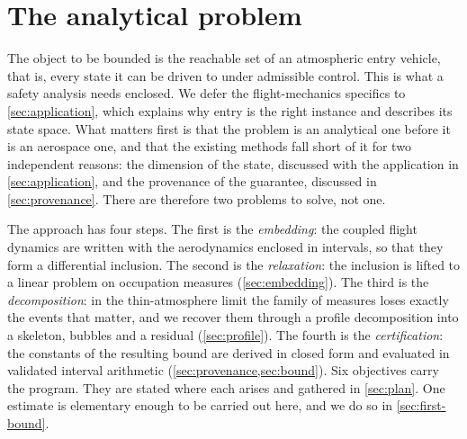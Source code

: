 \documentclass[english,11pt]{extarticle}
\begin{document}
\section{The analytical problem}
The object to be bounded is the reachable set of an atmospheric entry
vehicle, that is, every state it can be driven to under admissible control.
This is what a safety analysis needs enclosed. We defer the flight-mechanics
specifics to \cref{sec:application}, which explains why entry is the right
instance and describes its state space. What matters first is that the
problem is an analytical one before it is an aerospace one, and that the
existing methods fall short of it for two independent reasons: the
dimension of the state, discussed with the application in
\cref{sec:application}, and the provenance of the guarantee, discussed in
\cref{sec:provenance}. There are therefore two problems to solve, not one.

The approach has four steps. The first is the \emph{embedding}: the coupled
flight dynamics are written with the aerodynamics enclosed in intervals, so
that they form a differential inclusion. The second is the
\emph{relaxation}: the inclusion is lifted to a linear problem on occupation
measures (\cref{sec:embedding}). The third is the \emph{decomposition}: in
the thin-atmosphere limit the family of measures loses exactly the events
that matter, and we recover them through a profile decomposition into a
skeleton, bubbles and a residual (\cref{sec:profile}). The fourth is the
\emph{certification}: the constants of the resulting bound are derived in
closed form and evaluated in validated interval arithmetic
(\cref{sec:provenance,sec:bound}). Six objectives carry the program. They
are stated where each arises and gathered in \cref{sec:plan}. One estimate
is elementary enough to be carried out here, and we do so in
\cref{sec:first-bound}.
\end{document}
